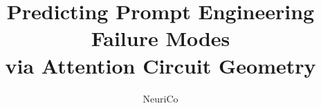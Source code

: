 \documentclass{article}
\title{Predicting Prompt Engineering Failure Modes\\via Attention Circuit Geometry}
\author{NeuriCo}
\begin{document}
\maketitle

\begin{abstract}

\end{abstract}










\end{document}
